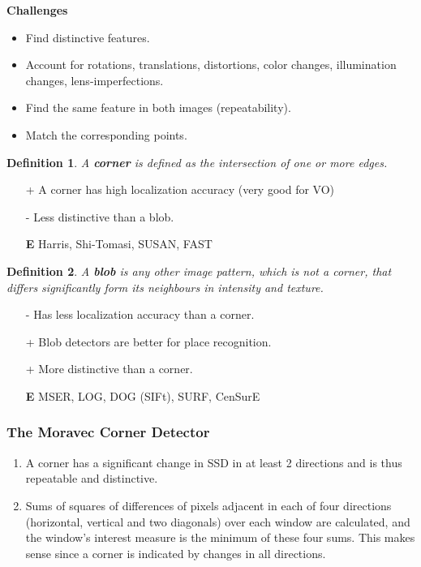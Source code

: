 \documentclass[10pt,a4paper]{scrartcl}
\newtheorem{define}{Definition}
\begin{document}
\begin{multicols*}{2}
\textbf{Challenges}
\begin{itemize}
\item Find distinctive features.
\item Account for rotations, translations, distortions, color changes, illumination changes, lens-imperfections.
\item Find the same feature in both images (repeatability).
\item Match the corresponding points.
\end{itemize}

\begin{define}
A \textbf{corner} is defined as the intersection of one or more edges.
\end{define}

\begin{itemize}
\item[+] A corner has high localization accuracy (very good for VO)
\item [-] Less distinctive than a blob.
\item [\textbf{E}] Harris, Shi-Tomasi, SUSAN, FAST
\end{itemize}

\begin{define}
A \textbf{blob} is any other image pattern, which is not a corner, that differs significantly form its neighbours in intensity and texture.
\end{define}

\begin{itemize}
\item [-] Has less localization accuracy than a corner.
\item [+] Blob detectors are better for place recognition.
\item [+] More distinctive than a corner.
\item [\textbf{E}] MSER, LOG, DOG (SIFt), SURF, CenSurE
\end{itemize}

\subsubsection{The Moravec Corner Detector}

\begin{enumerate}
\item A corner has a significant change in SSD in at least 2 directions and is thus repeatable and distinctive.
\item Sums of squares of differences of pixels adjacent in each of four directions (horizontal, vertical and two diagonals) over each window are calculated, and the window's interest measure is the minimum of these four sums. This makes sense since a corner is indicated by changes in all directions.
\end{enumerate}


\end{multicols*}
\end{document}
